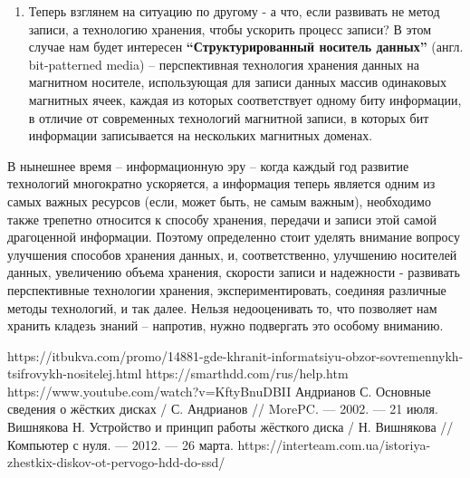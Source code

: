 \documentclass[bachelor, och, referat]{SCWorks}
\begin{document}
\begin{enumerate}
    \item Теперь взглянем на ситуацию по другому - а что, если развивать не метод записи, а технологию хранения, чтобы ускорить процесс записи? В этом случае нам будет интересен \textbf{``Структурированный носитель данных''} (англ. bit-patterned media) -- перспективная технология хранения данных на магнитном носителе, использующая для записи данных массив одинаковых магнитных ячеек, каждая из которых соответствует одному биту информации, в отличие от современных технологий магнитной записи, в которых бит информации записывается на нескольких магнитных доменах.
\end{enumerate}

\conclusion

В нынешнее время -- информационную эру -- когда каждый год развитие технологий многократно ускоряется, а информация теперь является одним из самых важных ресурсов (если, может быть, не самым важным), необходимо также трепетно относится к способу хранения, передачи и записи этой самой драгоценной информации. Поэтому определенно стоит уделять внимание вопросу улучшения способов хранения данных, и, соответственно, улучшению носителей данных, увеличению объема хранения, скорости записи и надежности - развивать перспективные технологии хранения, экспериментировать, соединяя различные методы технологий, и так далее. Нельзя недооценивать то, что позволяет нам хранить кладезь знаний -- напротив, нужно подвергать это особому вниманию.



\begin{thebibliography}{99}
     https://itbukva.com/promo/14881-gde-khranit-informatsiyu-obzor-sovremennykh-tsifrovykh-nositelej.html
     https://smarthdd.com/rus/help.htm
     https://www.youtube.com/watch?v=KftyBnuDBII
     Андрианов С. Основные сведения о жёстких дисках / С. Андрианов // MorePC. — 2002. — 21 июля.
     Вишнякова Н. Устройство и принцип работы жёсткого диска / Н. Вишнякова // Компьютер с нуля. — 2012. — 26 марта.
     https://interteam.com.ua/istoriya-zhestkix-diskov-ot-pervogo-hdd-do-ssd/
\end{thebibliography}

%
% 
% 


\end{document}
